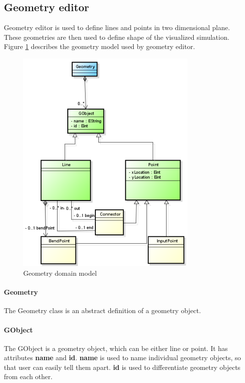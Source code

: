 \subsection{Geometry editor}
Geometry editor is used to define lines and points in two dimensional plane. These geometries are then used to define shape of the visualized simulation. Figure \ref{fig:model-geometry} describes the geometry model used by geometry editor.

\begin{figure}[htp]
\begin{center}
  \includegraphics[width=0.8\textwidth]{image/model-geometry.png}
  \caption{Geometry domain model}
  \label{fig:model-geometry}
\end{center}
\end{figure}

\paragraph{Geometry}
The Geometry class is an abstract definition of a geometry object.

\paragraph{GObject}
The GObject is a geometry object, which can be either line or point. It has attributes \textbf{name} and \textbf{id}. \textbf{name} is used to name individual geometry objects, so that user can easily tell them apart. \textbf{id} is used to differentiate geometry objects from each other.


